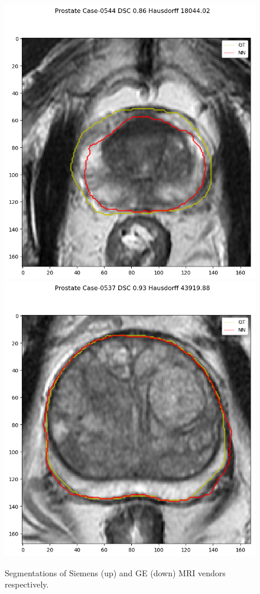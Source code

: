 \begin{figure}[h]
    \includegraphics[totalheight=.2\textheight]{imgs/results/Prostate_GE__GE_yes_ROI_MEAN_Case-0544.png}
    \includegraphics[totalheight=.2\textheight]{imgs/results/Prostate_GE__GE_yes_ROI_MAX_Case-0537.png}
    \caption{Segmentations of Siemens (up) and GE (down) MRI vendors respectively. }
    \label{fig:resseg}
\end{figure}

